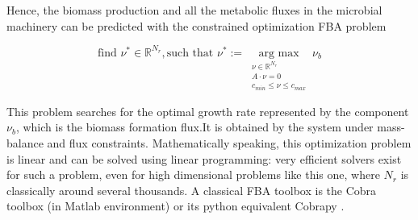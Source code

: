 \documentclass{article}
\DeclareMathOperator*{\argmax}{arg~max}
\newcommand{\R}{\mathbb{R}}
\begin{document}
Hence, the biomass production and all the metabolic fluxes in the microbial machinery can be predicted with the constrained optimization FBA problem

\begin{equation}
	\label{eq:maximization-FBA}
	\text{find }\nu^* \in \R^{N_r}, \text{such that } \nu^* := \argmax\limits_{\begin{array}{c}\nu \in \R^{N_r}\\ A \cdot \nu = 0 \\ c_{min} \leq \nu \leq c_{max} \end{array}} \nu_b
\end{equation}

This problem searches for the optimal growth rate represented by the component $\nu_b$, which is the biomass formation flux.It is obtained by the system under mass-balance and flux constraints. Mathematically speaking, this optimization problem is linear and can be solved using linear programming: very efficient solvers exist for such a problem, even for high dimensional problems like this one, where $N_r$ is classically around several thousands. A classical FBA toolbox is the Cobra toolbox (in Matlab environment)  \cite{Heirendt.2019} or its python equivalent Cobrapy \cite{ebrahim2013cobrapy}. 
	
\end{document}
